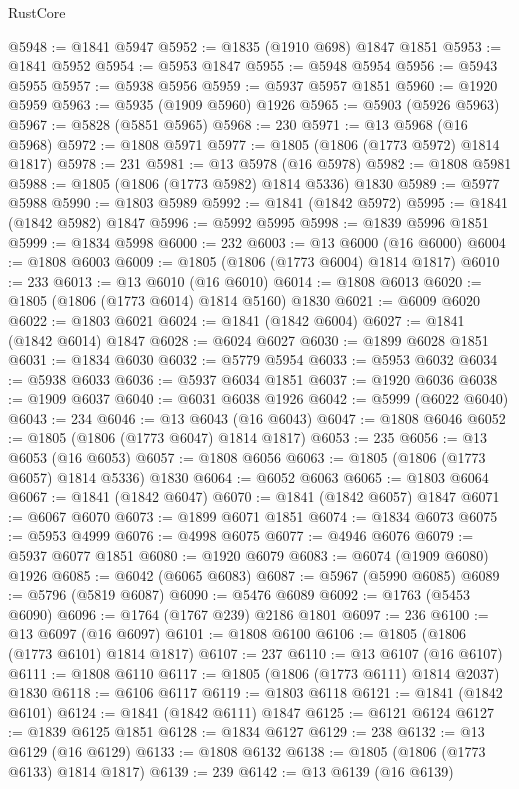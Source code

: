 \begin{lexlean}{RustCore}
\begin{coremodule}
@5948 := @1841 @5947
@5952 := @1835 (@1910 @698) @1847 @1851
@5953 := @1841 @5952
@5954 := @5953 @1847
@5955 := @5948 @5954
@5956 := @5943 @5955
@5957 := @5938 @5956
@5959 := @5937 @5957 @1851
@5960 := @1920 @5959
@5963 := @5935 (@1909 @5960) @1926
@5965 := @5903 (@5926 @5963)
@5967 := @5828 (@5851 @5965)
@5968 := 230
@5971 := @13 @5968 (@16 @5968)
@5972 := @1808 @5971
@5977 := @1805 (@1806 (@1773 @5972) @1814 @1817)
@5978 := 231
@5981 := @13 @5978 (@16 @5978)
@5982 := @1808 @5981
@5988 := @1805 (@1806 (@1773 @5982) @1814 @5336) @1830
@5989 := @5977 @5988
@5990 := @1803 @5989
@5992 := @1841 (@1842 @5972)
@5995 := @1841 (@1842 @5982) @1847
@5996 := @5992 @5995
@5998 := @1839 @5996 @1851
@5999 := @1834 @5998
@6000 := 232
@6003 := @13 @6000 (@16 @6000)
@6004 := @1808 @6003
@6009 := @1805 (@1806 (@1773 @6004) @1814 @1817)
@6010 := 233
@6013 := @13 @6010 (@16 @6010)
@6014 := @1808 @6013
@6020 := @1805 (@1806 (@1773 @6014) @1814 @5160) @1830
@6021 := @6009 @6020
@6022 := @1803 @6021
@6024 := @1841 (@1842 @6004)
@6027 := @1841 (@1842 @6014) @1847
@6028 := @6024 @6027
@6030 := @1899 @6028 @1851
@6031 := @1834 @6030
@6032 := @5779 @5954
@6033 := @5953 @6032
@6034 := @5938 @6033
@6036 := @5937 @6034 @1851
@6037 := @1920 @6036
@6038 := @1909 @6037
@6040 := @6031 @6038 @1926
@6042 := @5999 (@6022 @6040)
@6043 := 234
@6046 := @13 @6043 (@16 @6043)
@6047 := @1808 @6046
@6052 := @1805 (@1806 (@1773 @6047) @1814 @1817)
@6053 := 235
@6056 := @13 @6053 (@16 @6053)
@6057 := @1808 @6056
@6063 := @1805 (@1806 (@1773 @6057) @1814 @5336) @1830
@6064 := @6052 @6063
@6065 := @1803 @6064
@6067 := @1841 (@1842 @6047)
@6070 := @1841 (@1842 @6057) @1847
@6071 := @6067 @6070
@6073 := @1899 @6071 @1851
@6074 := @1834 @6073
@6075 := @5953 @4999
@6076 := @4998 @6075
@6077 := @4946 @6076
@6079 := @5937 @6077 @1851
@6080 := @1920 @6079
@6083 := @6074 (@1909 @6080) @1926
@6085 := @6042 (@6065 @6083)
@6087 := @5967 (@5990 @6085)
@6089 := @5796 (@5819 @6087)
@6090 := @5476 @6089
@6092 := @1763 (@5453 @6090)
@6096 := @1764 (@1767 @239) @2186 @1801
@6097 := 236
@6100 := @13 @6097 (@16 @6097)
@6101 := @1808 @6100
@6106 := @1805 (@1806 (@1773 @6101) @1814 @1817)
@6107 := 237
@6110 := @13 @6107 (@16 @6107)
@6111 := @1808 @6110
@6117 := @1805 (@1806 (@1773 @6111) @1814 @2037) @1830
@6118 := @6106 @6117
@6119 := @1803 @6118
@6121 := @1841 (@1842 @6101)
@6124 := @1841 (@1842 @6111) @1847
@6125 := @6121 @6124
@6127 := @1839 @6125 @1851
@6128 := @1834 @6127
@6129 := 238
@6132 := @13 @6129 (@16 @6129)
@6133 := @1808 @6132
@6138 := @1805 (@1806 (@1773 @6133) @1814 @1817)
@6139 := 239
@6142 := @13 @6139 (@16 @6139)

\end{coremodule}
\end{lexlean}

